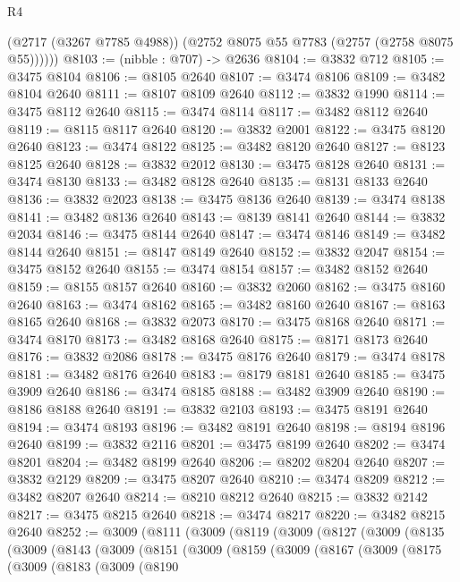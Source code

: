 \begin{lexlean}{R4}
\begin{coremodule}
          (@2717 (@3267 @7785 @4988))
          (@2752 @8075 @55 @7783 (@2757 (@2758 @8075 @55))))))
@8103 := (nibble : @707) -> @2636
@8104 := @3832 @712
@8105 := @3475 @8104
@8106 := @8105 @2640
@8107 := @3474 @8106
@8109 := @3482 @8104 @2640
@8111 := @8107 @8109 @2640
@8112 := @3832 @1990
@8114 := @3475 @8112 @2640
@8115 := @3474 @8114
@8117 := @3482 @8112 @2640
@8119 := @8115 @8117 @2640
@8120 := @3832 @2001
@8122 := @3475 @8120 @2640
@8123 := @3474 @8122
@8125 := @3482 @8120 @2640
@8127 := @8123 @8125 @2640
@8128 := @3832 @2012
@8130 := @3475 @8128 @2640
@8131 := @3474 @8130
@8133 := @3482 @8128 @2640
@8135 := @8131 @8133 @2640
@8136 := @3832 @2023
@8138 := @3475 @8136 @2640
@8139 := @3474 @8138
@8141 := @3482 @8136 @2640
@8143 := @8139 @8141 @2640
@8144 := @3832 @2034
@8146 := @3475 @8144 @2640
@8147 := @3474 @8146
@8149 := @3482 @8144 @2640
@8151 := @8147 @8149 @2640
@8152 := @3832 @2047
@8154 := @3475 @8152 @2640
@8155 := @3474 @8154
@8157 := @3482 @8152 @2640
@8159 := @8155 @8157 @2640
@8160 := @3832 @2060
@8162 := @3475 @8160 @2640
@8163 := @3474 @8162
@8165 := @3482 @8160 @2640
@8167 := @8163 @8165 @2640
@8168 := @3832 @2073
@8170 := @3475 @8168 @2640
@8171 := @3474 @8170
@8173 := @3482 @8168 @2640
@8175 := @8171 @8173 @2640
@8176 := @3832 @2086
@8178 := @3475 @8176 @2640
@8179 := @3474 @8178
@8181 := @3482 @8176 @2640
@8183 := @8179 @8181 @2640
@8185 := @3475 @3909 @2640
@8186 := @3474 @8185
@8188 := @3482 @3909 @2640
@8190 := @8186 @8188 @2640
@8191 := @3832 @2103
@8193 := @3475 @8191 @2640
@8194 := @3474 @8193
@8196 := @3482 @8191 @2640
@8198 := @8194 @8196 @2640
@8199 := @3832 @2116
@8201 := @3475 @8199 @2640
@8202 := @3474 @8201
@8204 := @3482 @8199 @2640
@8206 := @8202 @8204 @2640
@8207 := @3832 @2129
@8209 := @3475 @8207 @2640
@8210 := @3474 @8209
@8212 := @3482 @8207 @2640
@8214 := @8210 @8212 @2640
@8215 := @3832 @2142
@8217 := @3475 @8215 @2640
@8218 := @3474 @8217
@8220 := @3482 @8215 @2640
@8252 := @3009
    (@8111
      (@3009
        (@8119
          (@3009
            (@8127
              (@3009
                (@8135
                  (@3009
                    (@8143
                      (@3009
                        (@8151
                          (@3009
                            (@8159
                              (@3009
                                (@8167
                                  (@3009
                                    (@8175
                                      (@3009
                                        (@8183
                                          (@3009
                                            (@8190

\end{coremodule}
\end{lexlean}
